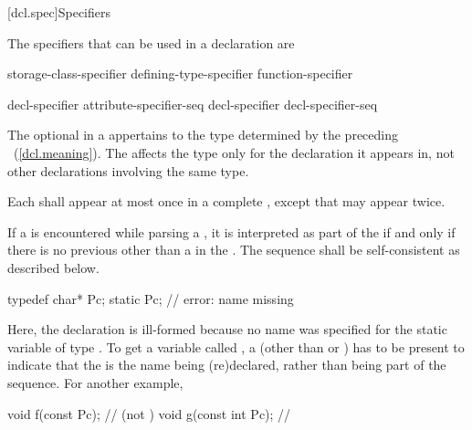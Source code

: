 [dcl.spec]{Specifiers}%

\pnum
{}%
The specifiers that can be used in a declaration are

\begin{bnf}
\br
    storage-class-specifier\br
    defining-type-specifier\br
    function-specifier\br
    \br
    \br
    \br
\end{bnf}

\begin{bnf}
\br
    decl-specifier attribute-specifier-seq\opt\br
    decl-specifier decl-specifier-seq
\end{bnf}

The optional  in a 
appertains to the type determined by the preceding
~(\ref{dcl.meaning}). The 
affects the type only for the declaration it appears in, not other declarations involving the
same type.

\pnum
Each  shall appear at most once in a complete
, except that
 may appear twice.

\pnum
{}%
If a  is encountered while parsing a ,
it is interpreted as part of the  if and only if there is no
previous  other than a  in the
.
The sequence shall be self-consistent as
described below.
\begin{example}

\begin{codeblock}
typedef char* Pc;
static Pc;                      // error: name missing
\end{codeblock}

Here, the declaration   is ill-formed because no
name was specified for the static variable of type . To get a
variable called , a  (other than
 or ) has to be present to indicate that
the   is the name being (re)declared,
rather than being part of the  sequence. For
another example,

\begin{codeblock}
void f(const Pc);               //  (not )
void g(const int Pc);           // 
\end{codeblock}
\end{example}

